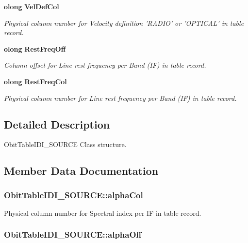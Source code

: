 \begin{CompactItemize}
{\bf olong} {\bf Vel\-Def\-Col}
\begin{CompactList}\small\item\em Physical column number for Velocity definition 'RADIO' or 'OPTICAL' in table record. \item\end{CompactList}\item 
{\bf olong} {\bf Rest\-Freq\-Off}
\begin{CompactList}\small\item\em Column offset for Line rest frequency per Band (IF) in table record. \item\end{CompactList}\item 
{\bf olong} {\bf Rest\-Freq\-Col}
\begin{CompactList}\small\item\em Physical column number for Line rest frequency per Band (IF) in table record. \item\end{CompactList}\end{CompactItemize}


\subsection{Detailed Description}
Obit\-Table\-IDI\_\-SOURCE Class structure. 



\subsection{Member Data Documentation}
\subsubsection{ {\bf Obit\-Table\-IDI\_\-SOURCE::alpha\-Col}}\label{structObitTableIDI__SOURCE_o61}


Physical column number for Spectral index per IF in table record. 

\subsubsection{ {\bf Obit\-Table\-IDI\_\-SOURCE::alpha\-Off}}\label{structObitTableIDI__SOURCE_o60}


